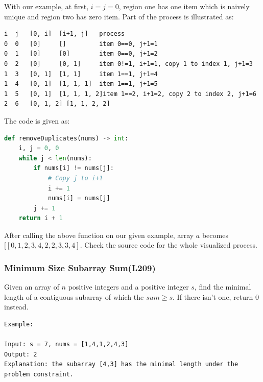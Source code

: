\documentclass[../main.tex]{subfiles}
\begin{document}
With our example, at first, $i=j=0$, region one has one item which is naively unique and region two has zero item. Part of the process is illustrated as:
\begin{lstlisting}[numbers=none]
i  j   [0, i]  [i+1, j]   process
0  0   [0]     []         item 0==0, j+1=1
0  1   [0]     [0]        item 0==0, j+1=2
0  2   [0]     [0, 1]     item 0!=1, i+1=1, copy 1 to index 1, j+1=3
1  3   [0, 1]  [1, 1]     item 1==1, j+1=4
1  4   [0, 1]  [1, 1, 1]  item 1==1, j+1=5
1  5   [0, 1]  [1, 1, 1, 2]item 1==2, i+1=2, copy 2 to index 2, j+1=6
2  6   [0, 1, 2] [1, 1, 2, 2]
\end{lstlisting}
The code is given as:
\begin{lstlisting}[language=Python]
def removeDuplicates(nums) -> int:
    i, j = 0, 0
    while j < len(nums):
        if nums[i] != nums[j]:
            # Copy j to i+1
            i += 1
            nums[i] = nums[j]
        j += 1
    return i + 1
\end{lstlisting}
After calling the above function on our given example, array $a$ becomes $[[0, 1, 2, 3, 4, 2, 2, 3, 3, 4]$. Check the source code for the whole visualized process.

\subsubsection{Minimum Size Subarray Sum(L209)} Given an array of $n$ positive integers and a positive integer $s$, find the minimal length of a contiguous subarray of which the $sum \geq s$. If there isn't one, return 0 instead.
\begin{lstlisting}[numbers=none]
Example: 

Input: s = 7, nums = [1,4,1,2,4,3]
Output: 2
Explanation: the subarray [4,3] has the minimal length under the problem constraint.
\end{lstlisting}
\end{document}

